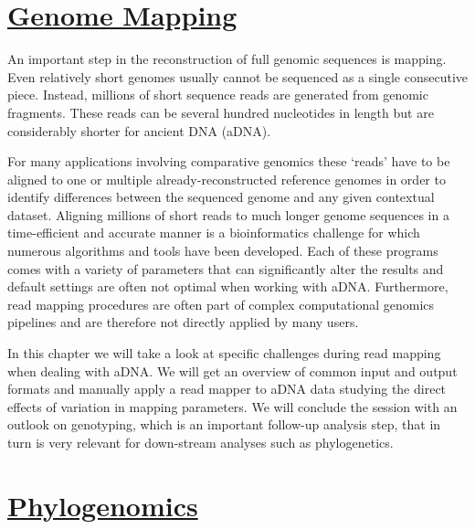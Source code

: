 \documentclass[
  letterpaper,
]{book}
\begin{document}
\hypertarget{genome-mapping}{%
\section*{\texorpdfstring{\protect\hyperlink{genome-mapping-1}{Genome
Mapping}}{Genome Mapping}}\label{genome-mapping}}


An important step in the reconstruction of full genomic sequences is
mapping. Even relatively short genomes usually cannot be sequenced as a
single consecutive piece. Instead, millions of short sequence reads are
generated from genomic fragments. These reads can be several hundred
nucleotides in length but are considerably shorter for ancient DNA
(aDNA).

For many applications involving comparative genomics these `reads' have
to be aligned to one or multiple already-reconstructed reference genomes
in order to identify differences between the sequenced genome and any
given contextual dataset. Aligning millions of short reads to much
longer genome sequences in a time-efficient and accurate manner is a
bioinformatics challenge for which numerous algorithms and tools have
been developed. Each of these programs comes with a variety of
parameters that can significantly alter the results and default settings
are often not optimal when working with aDNA. Furthermore, read mapping
procedures are often part of complex computational genomics pipelines
and are therefore not directly applied by many users.

In this chapter we will take a look at specific challenges during read
mapping when dealing with aDNA. We will get an overview of common input
and output formats and manually apply a read mapper to aDNA data
studying the direct effects of variation in mapping parameters. We will
conclude the session with an outlook on genotyping, which is an
important follow-up analysis step, that in turn is very relevant for
down-stream analyses such as phylogenetics.

\hypertarget{phylogenomics}{%
\section*{\texorpdfstring{\protect\hyperlink{introduction-to-phylogenomics}{Phylogenomics}}{Phylogenomics}}\label{phylogenomics}}
\end{document}
